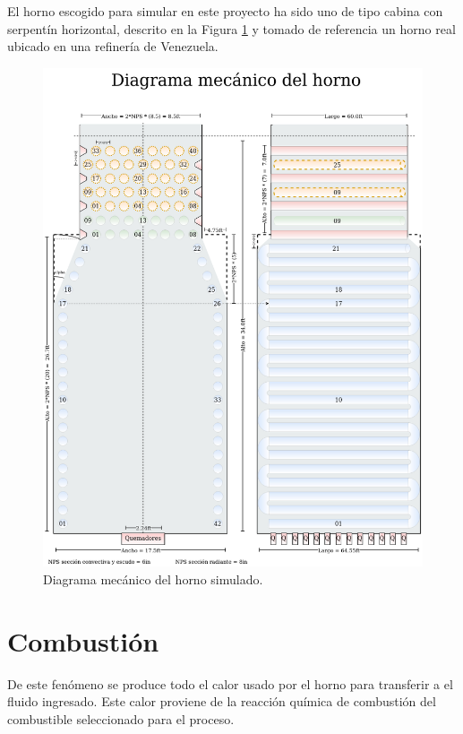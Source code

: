 \par El horno escogido para simular en este proyecto ha sido uno de tipo cabina con serpentín horizontal, descrito en la Figura \ref{fig:diagrama-meca} y tomado de referencia un horno real ubicado en una refinería de Venezuela.

\begin{figure}[hbt]
\begin{center}
\includegraphics[scale=0.38]{images/diagrama-meca}
\caption[Diagrama mecánico]{Diagrama mecánico del horno simulado.}
\label{fig:diagrama-meca}
\end{center}
\end{figure}

\section{Combustión}
\par De este fenómeno se produce todo el calor usado por el horno para transferir a el fluido ingresado. Este calor proviene de la reacción química de combustión del combustible seleccionado para el proceso.

